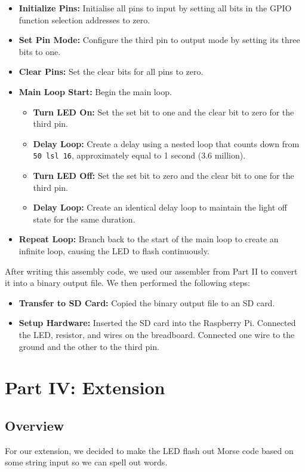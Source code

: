 \documentclass{article}
\begin{document}
\begin{itemize}
    \item \textbf{Initialize Pins:} Initialise all pins to input by setting all bits in the GPIO function selection addresses to zero.
    \item \textbf{Set Pin Mode:} Configure the third pin to output mode by setting its three bits to one.
    \item \textbf{Clear Pins:} Set the clear bits for all pins to zero.
    \item \textbf{Main Loop Start:} Begin the main loop.
    \begin{itemize}
        \item \textbf{Turn LED On:} Set the set bit to one and the clear bit to zero for the third pin.
        \item \textbf{Delay Loop:} Create a delay using a nested loop that counts down from \texttt{50 lsl 16}, approximately equal to 1 second (3.6 million).
        \item \textbf{Turn LED Off:} Set the set bit to zero and the clear bit to one for the third pin.
        \item \textbf{Delay Loop:} Create an identical delay loop to maintain the light off state for the same duration.
    \end{itemize}
    \item \textbf{Repeat Loop:} Branch back to the start of the main loop to create an infinite loop, causing the LED to flash continuously.
\end{itemize}

After writing this assembly code, we used our assembler from Part II to convert it into a binary output file. We then performed the following steps:

\begin{itemize}
    \item \textbf{Transfer to SD Card:} Copied the binary output file to an SD card.
    \item \textbf{Setup Hardware:} Inserted the SD card into the Raspberry Pi. Connected the LED, resistor, and wires on the breadboard. Connected one wire to the ground and the other to the third pin.
\end{itemize}

\section{Part IV: Extension}
\label{sec:extension}
\subsection{Overview}
For our extension, we decided to make the LED flash out Morse code based on some string input so we can spell out words.
\end{document}

